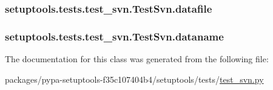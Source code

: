 \subsubsection[{datafile}]{\setlength{\rightskip}{0pt plus 5cm}setuptools.\+tests.\+test\+\_\+svn.\+Test\+Svn.\+datafile}\label{classsetuptools_1_1tests_1_1test__svn_1_1TestSvn_add050937bc63ee49a14999b44bf2e44a}
\hypertarget{classsetuptools_1_1tests_1_1test__svn_1_1TestSvn_ae6afadcc81dbe4f2500dbace941730a5}{}
\subsubsection[{dataname}]{\setlength{\rightskip}{0pt plus 5cm}setuptools.\+tests.\+test\+\_\+svn.\+Test\+Svn.\+dataname}\label{classsetuptools_1_1tests_1_1test__svn_1_1TestSvn_ae6afadcc81dbe4f2500dbace941730a5}


The documentation for this class was generated from the following file\+:\begin{DoxyCompactItemize}
\item 
packages/pypa-\/setuptools-\/f35c107404b4/setuptools/tests/\hyperlink{test__svn_8py}{test\+\_\+svn.\+py}\end{DoxyCompactItemize}
